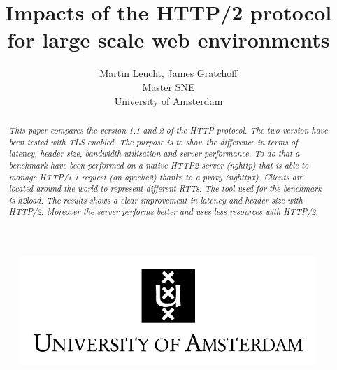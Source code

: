 \documentclass[10pt]{article}
\begin{document}
 
\begin{figure}[!bh]
 	\begin{center}
 	 
 		\huge \title{Impacts of the HTTP/2 protocol for large scale web environments}
		\author{Martin Leucht, James Gratchoff \\
		Master SNE \\ University of Amsterdam} 
		\includegraphics{images/uva.jpeg}
	\maketitle 
		\label{sec:uva}
	\end{center}
\end{figure}
\setlength{\columnsep}{2cm}
\def\columnseprulecolor{\color{blue}}
 
\newpage
\begin{abstract}
\textit{This paper compares the version 1.1 and 2 of the HTTP protocol. The two version have been tested with TLS enabled. The purpose is to show the difference in terms of latency, header size, bandwidth utilisation and server performance. To do that a benchmark have been performed on a native HTTP2 server (nghttp) that is able to manage HTTP/1.1 request (on apache2) thanks to a proxy (nghttpx). Clients are located around the world to represent different RTTs. The tool used for the benchmark is h2load. The results shows a clear improvement in latency and header size with HTTP/2. Moreover the server performs better and uses less resources with HTTP/2.}
\end{abstract}

\newpage
\tableofcontents

\newpage
\newpage







\newpage




\newpage

\newpage

\newpage

\newpage

\end{document}
